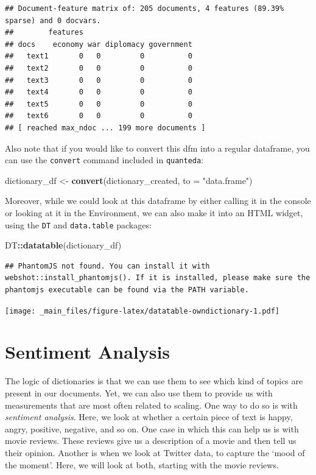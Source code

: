 \documentclass[
]{book}
\newenvironment{Shaded}{\begin{snugshade}}{\end{snugshade}}
\newcommand{\AttributeTok}[1]{\textcolor[rgb]{0.13,0.29,0.53}{#1}}
\newcommand{\FunctionTok}[1]{\textcolor[rgb]{0.13,0.29,0.53}{\textbf{#1}}}
\newcommand{\NormalTok}[1]{#1}
\newcommand{\OtherTok}[1]{\textcolor[rgb]{0.56,0.35,0.01}{#1}}
\newcommand{\SpecialCharTok}[1]{\textcolor[rgb]{0.81,0.36,0.00}{\textbf{#1}}}
\newcommand{\StringTok}[1]{\textcolor[rgb]{0.31,0.60,0.02}{#1}}
\begin{document}
\begin{verbatim}
## Document-feature matrix of: 205 documents, 4 features (89.39% sparse) and 0 docvars.
##        features
## docs    economy war diplomacy government
##   text1       0   0         0          0
##   text2       0   0         0          0
##   text3       0   0         0          0
##   text4       0   0         0          0
##   text5       0   0         0          0
##   text6       0   0         0          0
## [ reached max_ndoc ... 199 more documents ]
\end{verbatim}

Also note that if you would like to convert this dfm into a regular dataframe, you can use the \texttt{convert} command included in \texttt{quanteda}:

\begin{Shaded}
\begin{Highlighting}[]
\NormalTok{dictionary\_df }\OtherTok{\textless{}{-}} \FunctionTok{convert}\NormalTok{(dictionary\_created, }\AttributeTok{to =} \StringTok{"data.frame"}\NormalTok{)}
\end{Highlighting}
\end{Shaded}

Moreover, while we could look at this dataframe by either calling it in the console or looking at it in the Environment, we can also make it into an HTML widget, using the \texttt{DT} and \texttt{data.table} packages:

\begin{Shaded}
\begin{Highlighting}[]
\NormalTok{DT}\SpecialCharTok{::}\FunctionTok{datatable}\NormalTok{(dictionary\_df)}
\end{Highlighting}
\end{Shaded}

\begin{verbatim}
## PhantomJS not found. You can install it with webshot::install_phantomjs(). If it is installed, please make sure the phantomjs executable can be found via the PATH variable.
\end{verbatim}

\texttt{[image: \_main\_files/figure-latex/datatable-owndictionary-1.pdf]}

\section{Sentiment Analysis}\label{sentiment-analysis}

The logic of dictionaries is that we can use them to see which kind of topics are present in our documents. Yet, we can also use them to provide us with measurements that are most often related to scaling. One way to do so is with \emph{sentiment analysis}. Here, we look at whether a certain piece of text is happy, angry, positive, negative, and so on. One case in which this can help us is with movie reviews. These reviews give us a description of a movie and then tell us their opinion. Another is when we look at Twitter data, to capture the `mood of the moment'. Here, we will look at both, starting with the movie reviews.
\end{document}
